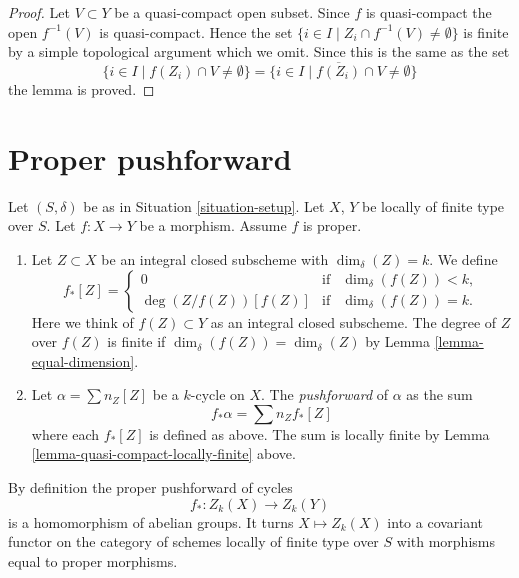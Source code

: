 \begin{proof}
Let $V \subset Y$ be a quasi-compact open subset.
Since $f$ is quasi-compact the open $f^{-1}(V)$ is
quasi-compact. Hence the set
$\{i \in I \mid Z_i \cap f^{-1}(V) \not = \emptyset \}$
is finite by a simple topological argument which we omit.
Since this is the same as the set
$$
\{i \in I \mid f(Z_i) \cap V \not = \emptyset \} =
\{i \in I \mid \overline{f(Z_i)} \cap V \not = \emptyset \}
$$
the lemma is proved.
\end{proof}









\section{Proper pushforward}
\label{section-proper-pushforward}

\begin{definition}
\label{definition-proper-pushforward}
Let $(S, \delta)$ be as in Situation \ref{situation-setup}.
Let $X$, $Y$ be locally of finite type over $S$.
Let $f : X \to Y$ be a morphism.
Assume $f$ is proper.
\begin{enumerate}
\item Let $Z \subset X$ be an integral closed subscheme
with $\dim_\delta(Z) = k$. We define
$$
f_*[Z] =
\left\{
\begin{matrix}
0 & \text{if} & \dim_\delta(f(Z))< k, \\
\deg(Z/f(Z)) [f(Z)] & \text{if} & \dim_\delta(f(Z)) = k.
\end{matrix}
\right.
$$
Here we think of $f(Z) \subset Y$ as an integral closed subscheme.
The degree of $Z$ over $f(Z)$ is finite if
$\dim_\delta(f(Z)) = \dim_\delta(Z)$
by Lemma \ref{lemma-equal-dimension}.
\item Let $\alpha = \sum n_Z [Z]$ be a $k$-cycle on $X$. The
{\it pushforward} of $\alpha$ as the sum
$$
f_* \alpha = \sum n_Z f_*[Z]
$$
where each $f_*[Z]$ is defined as above. The sum is locally finite
by Lemma \ref{lemma-quasi-compact-locally-finite} above.
\end{enumerate}
\end{definition}

\noindent
By definition the proper pushforward of cycles
$$
f_* : Z_k(X) \longrightarrow Z_k(Y)
$$
is a homomorphism of abelian groups. It turns $X \mapsto Z_k(X)$
into a covariant functor on the category of schemes locally of
finite type over $S$ with morphisms equal to proper morphisms.

